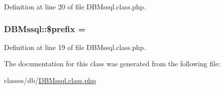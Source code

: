 Definition at line 20 of file D\+B\+Mssql.\+class.\+php.

\subsubsection[{\texorpdfstring{\$prefix}{$prefix}}]{\setlength{\rightskip}{0pt plus 5cm}D\+B\+Mssql\+::\$prefix = \textquotesingle{}}\hypertarget{classDBMssql_a733cd192b424b5a66ea14e3e62391844}{}\label{classDBMssql_a733cd192b424b5a66ea14e3e62391844}


Definition at line 19 of file D\+B\+Mssql.\+class.\+php.



The documentation for this class was generated from the following file\+:\begin{DoxyCompactItemize}
\item 
classes/db/\hyperlink{DBMssql_8class_8php}{D\+B\+Mssql.\+class.\+php}\end{DoxyCompactItemize}

